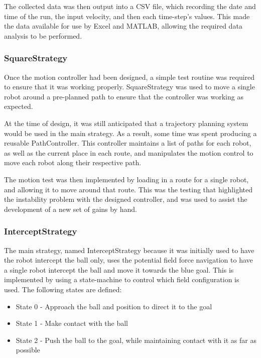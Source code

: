 \documentclass[10pt]{article}
\begin{document}
The collected data was then output into a CSV file, which recording the
date and time of the run, the input velocity, and then each time-step's values. 
This made the data available for use by Excel and MATLAB, allowing the required
data analysis to be performed.

\subsubsection{SquareStrategy}

Once the motion controller had been designed, a simple test routine was required
to ensure that it was working properly.  SquareStrategy was used to move a
single robot around a pre-planned path to ensure that the controller was working
as expected.

At the time of design, it was still anticipated that a trajectory planning
system would be used in the main strategy.  As a result, some time was spent
producing a reusable PathController.  This controller maintains a list of paths
for each robot, as well as the current place in each route, and manipulates the
motion control to move each robot along their respective path.

The motion test was then implemented by loading in a route for a single robot,
and allowing it to move around that route.  This was the testing that
highlighted the instability problem with the designed controller, and was used
to assist the development of a new set of gains by hand.

\subsubsection{InterceptStrategy}

The main strategy, named InterceptStrategy because it was initially used to have
the robot intercept the ball only, uses the potential field force navigation to
have a single robot intercept the ball and move it towards the blue goal.  This
is implemented by using a state-machine to control which field configuration is
used. The following states are defined:

\begin{itemize}
  \item State 0 - Approach the ball and position to direct it to the goal
  \item State 1 - Make contact with the ball
  \item State 2 - Push the ball to the goal, while maintaining contact with it
  as far as possible
\end{itemize}
\end{document}
